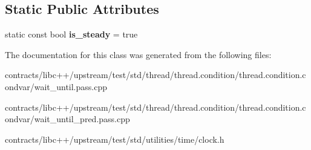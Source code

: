 \subsection*{Static Public Attributes}
\begin{DoxyCompactItemize}
\item 
\mbox{\label{struct_clock_a4229a57db7fb8a5dbb9049aeeee5f01a}} 
static const bool {\bfseries is\+\_\+steady} = true
\end{DoxyCompactItemize}


The documentation for this class was generated from the following files\+:\begin{DoxyCompactItemize}
\item 
contracts/libc++/upstream/test/std/thread/thread.\+condition/thread.\+condition.\+condvar/wait\+\_\+until.\+pass.\+cpp\item 
contracts/libc++/upstream/test/std/thread/thread.\+condition/thread.\+condition.\+condvar/wait\+\_\+until\+\_\+pred.\+pass.\+cpp\item 
contracts/libc++/upstream/test/std/utilities/time/clock.\+h\end{DoxyCompactItemize}
